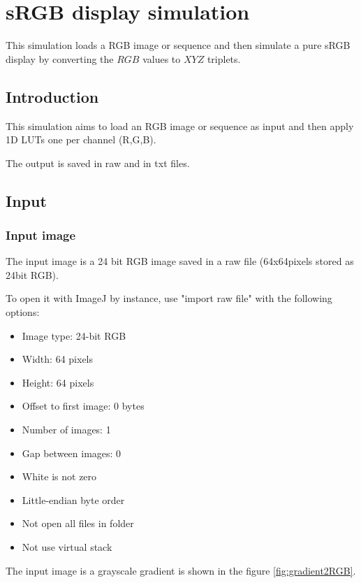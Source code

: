 \chapter{sRGB display simulation}
\minitoc{}

This simulation loads a RGB image or sequence and then simulate a pure sRGB display by converting the $RGB$ values to $XYZ$ triplets.

\section{Introduction}

This simulation aims to load an RGB image or sequence as input and then apply 1D LUTs one per channel (R,G,B).

The output is saved in raw and in txt files.

\section{Input}

\subsection{Input image}

The input image is a 24 bit RGB image saved in a raw file (64x64pixels stored as 24bit RGB).

To open it with ImageJ by instance, use "import raw file" with the following options:
\begin{itemize}
\item Image type: 24-bit RGB
\item Width: 64 pixels
\item Height: 64 pixels
\item Offset to first image: 0 bytes
\item Number of images: 1
\item Gap between images: 0
\item White is not zero
\item Little-endian byte order
\item Not open all files in folder
\item Not use virtual stack
\end{itemize}

The input image is a grayscale gradient is shown in the figure \ref{fig:gradient2RGB}.


